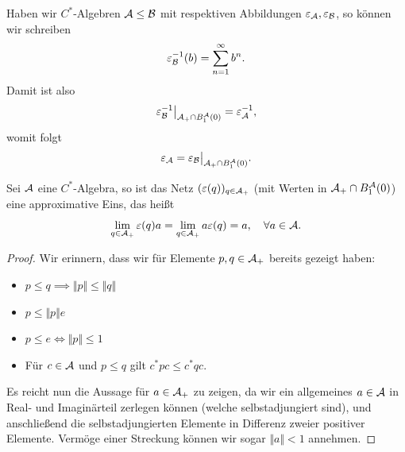 
Haben wir $C^*$-Algebren $\mathcal{A} \leq \mathcal{B}$ mit respektiven Abbildungen $\varepsilon_{\mathcal{A}}, \varepsilon_{\mathcal{B}}$, so können wir schreiben
\[
    \varepsilon_{\mathcal{B}}^{-1}(b) = \sum_{n=1}^\infty b^n.
\]
Damit ist also
\[
    \restr{\varepsilon_\Ba^{-1}}{\Aa_+ \cap B_1^\Aa (0)} = \varepsilon_\Aa^{-1},
\]
womit folgt
\[
    \varepsilon_\Aa = \restr{\varepsilon_\Ba}{\Aa_+ \cap B_1^\Aa (0)}.
\]

\begin{lemma}
    Sei $\mathcal{A}$ eine $C^*$-Algebra, so ist das Netz $(\varepsilon(q))_{q \in \mathcal{A}_+}$ (mit Werten in $\mathcal{A}_+ \cap B_1^{\mathcal{A}} (0)$) eine approximative Eins, das heißt
    \[
        \lim_{q \in \mathcal{A}_+} \varepsilon(q) a = \lim_{q \in \mathcal{A}_+} a \varepsilon(q) = a, \quad \forall a \in \mathcal{A}.
    \]
\end{lemma}

\begin{proof}
    Wir erinnern, dass wir für Elemente $p, q \in \mathcal{A}_+$ bereits gezeigt haben:
    \begin{itemize}
        \item $p \leq q \implies \Vert p \Vert \leq \Vert q \Vert$
        \item $p \leq \Vert p \Vert e$
        \item $p \leq e \Leftrightarrow \Vert p \Vert \leq 1$
        \item Für $c \in \mathcal{A}$ und $p \leq q$ gilt $c^* p c \leq c^* q c$.
    \end{itemize}
    Es reicht nun die Aussage für $a \in \mathcal{A}_+$ zu zeigen, da wir ein allgemeines $a \in \mathcal{A}$ in Real- und Imaginärteil zerlegen können (welche selbstadjungiert sind), und anschließend die selbstadjungierten Elemente in Differenz zweier positiver Elemente. Vermöge einer Streckung können wir sogar $\Vert a \Vert < 1$ annehmen.


\end{proof}
